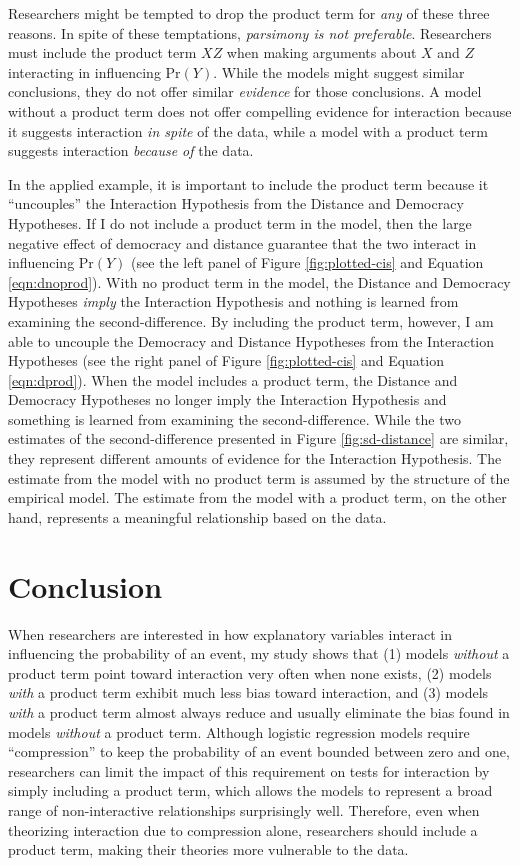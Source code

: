 \documentclass[12pt]{article}
\begin{document}
Researchers might be tempted to drop the product term for \textit{any} of these three reasons. In spite of these temptations, \textit{parsimony is not preferable}. Researchers must include the product term $XZ$ when making arguments about $X$ and $Z$ interacting in influencing $\text{Pr}(Y)$. While the models might suggest similar conclusions, they do not offer similar \textit{evidence} for those conclusions. A model without a product term does not offer compelling evidence for interaction because it suggests interaction \textit{in spite} of the data, while a model with a product term suggests interaction \textit{because of} the data.

In the applied example, it is important to include the product term because it ``uncouples'' the Interaction Hypothesis from the Distance and Democracy Hypotheses. If I do not include a product term in the model, then the large negative effect of democracy and distance guarantee that the two interact in influencing $\text{Pr}(Y)$ (see the left panel of Figure \ref{fig:plotted-cis} and Equation \ref{eqn:dnoprod}). With no product term in the model, the Distance and Democracy Hypotheses \textit{imply} the Interaction Hypothesis and nothing is learned from examining the second-difference. By including the product term, however, I am able to uncouple the Democracy and Distance Hypotheses from the Interaction Hypotheses (see the right panel of Figure \ref{fig:plotted-cis} and Equation \ref{eqn:dprod}). When the model includes a product term, the Distance and Democracy Hypotheses no longer imply the Interaction Hypothesis and something is learned from examining the second-difference. While the two estimates of the second-difference presented in Figure \ref{fig:sd-distance} are similar, they represent different amounts of evidence for the Interaction Hypothesis. The estimate from the model with no product term is assumed by the structure of the empirical model. The estimate from the model with a product term, on the other hand, represents a meaningful relationship based on the data. 
\section*{Conclusion}

When researchers are interested in how explanatory variables interact in influencing the probability of an event, my study shows that (1) models \textit{without} a product term point toward interaction very often when none exists, (2) models \textit{with} a product term exhibit much less bias toward interaction, and (3) models \textit{with} a product term almost always reduce and usually eliminate the bias found in models \textit{without }a product term.  Although logistic regression models require ``compression''  to keep the probability of an event bounded between zero and one, researchers can limit the impact of this requirement on tests for interaction by simply including a product term, which allows the models to represent a  broad range of non-interactive relationships surprisingly well. Therefore, even when theorizing interaction due to compression alone, researchers should include a product term, making their theories more vulnerable to the data.\normalsize
\end{document}
